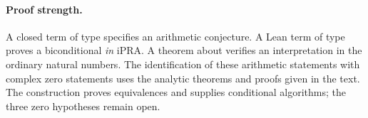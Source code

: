 \paragraph{Proof strength.}
A closed term of type  specifies an arithmetic conjecture. A Lean term of type  proves a biconditional \emph{in} iPRA. A theorem about  verifies an interpretation in the ordinary natural numbers. The identification of these arithmetic statements with complex zero statements uses the analytic theorems and proofs given in the text. The construction proves equivalences and supplies conditional algorithms; the three zero hypotheses remain open.
\newpage
